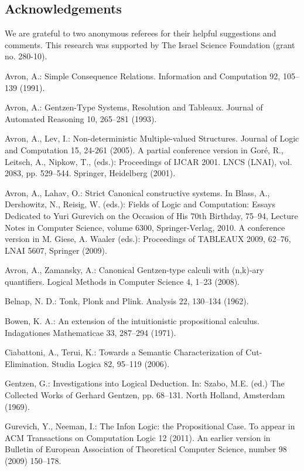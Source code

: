 \documentclass{LMCS}
\theoremstyle{remark}
\begin{document}
\begin{enumerate}[(a)]
\begin{enumerate}[\bf(a):]
\section*{Acknowledgements}
We are grateful to two anonymous referees for their helpful suggestions
and comments.
This research was supported by The Israel Science Foundation (grant no. 280-10).


\begin{thebibliography}{99}

Avron, A.: Simple Consequence Relations. 
Information and Computation 92, 105--139 (1991).

Avron, A.: Gentzen-Type Systems, Resolution and Tableaux.
Journal of Automated Reasoning 10, 265--281 (1993).



Avron, A., Lev, I.: Non-deterministic Multiple-valued Structures.
Journal of Logic and Computation 15, 24-261 (2005). A partial
conference version in Gor\'{e}, R., Leitsch, A., Nipkow, T., (eds.):
Proceedings of  IJCAR 2001.
LNCS (LNAI), vol. 2083, pp. 529--544.
Springer, Heidelberg (2001).

 Avron, A., Lahav, O.: Strict Canonical constructive systems.
In Blass, A., Dershowitz, N., Reisig, W. (eds.): 
Fields of Logic and Computation:
Essays Dedicated to Yuri Gurevich on the Occasion of His 70th Birthday,
75--94, 
Lecture Notes in Computer Science, volume 6300, Springer-Verlag, 2010.
A conference version in M. Giese, A. Waaler (eds.):
Proceedings of TABLEAUX 2009, 62--76, LNAI 5607, Springer (2009).

 Avron, A., Zamansky, A.: Canonical Gentzen-type calculi with (n,k)-ary quantifiers.
Logical Methods in Computer Science 4, 1--23 (2008).

Belnap, N. D.: Tonk, Plonk and Plink. Analysis 22, 130--134 (1962).

Bowen, K. A.: An extension of the intuitionistic propositional calculus.
Indagationes Mathematicae 33, 287--294 (1971).

Ciabattoni, A.,  Terui, K.:
Towards a Semantic Characterization of Cut-Elimination.
Studia Logica  82, 95--119 (2006).

Gentzen, G.: Investigations into Logical Deduction.
In: Szabo, M.E. (ed.) The Collected Works of Gerhard Gentzen,
pp. 68--131. North Holland, Amsterdam (1969).

Gurevich, Y., Neeman, I.: The Infon Logic: the Propositional Case.
To appear in ACM Transactions on Computation Logic 12 (2011).
An earlier version in 
Bulletin of European Association of Theoretical Computer Science,
number 98 (2009) 150--178.



\end{thebibliography}
\end{enumerate}
\end{enumerate}
\end{document}
